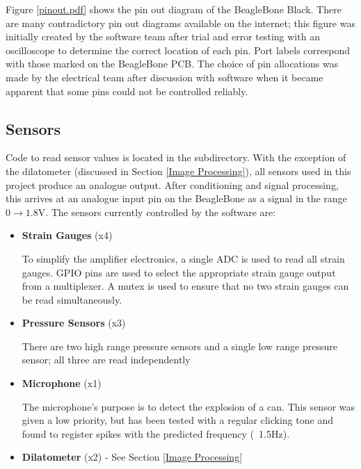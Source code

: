 Figure \ref{pinout.pdf} shows the pin out diagram of the BeagleBone Black. There are many contradictory pin out diagrams available on the internet; this figure was initially created by the software team after trial and error testing with an oscilloscope to determine the correct location of each pin. Port labels correspond with those marked on the BeagleBone PCB. The choice of pin allocations was made by the electrical team after discussion with software when it became apparent that some pins could not be controlled reliably.




\subsection{Sensors}

Code to read sensor values is located in the  subdirectory. With the exception of the dilatometer (discussed in Section \ref{Image Processing}), all sensors used in this project produce an analogue output. After conditioning and signal processing, this arrives at an analogue input pin on the BeagleBone as a signal in the range $0\to1.8\text{V}$. The sensors currently controlled by the software are:

\begin{itemize}
	\item {\bf Strain Gauges} (x4) 

	To simplify the amplifier electronics, a single ADC is used to read all strain gauges. GPIO pins are used to select the appropriate strain gauge output from a multiplexer. A mutex is used to ensure that no two strain gauges can be read simultaneously.


	\item {\bf Pressure Sensors} (x3) 

	 There are two high range pressure sensors and a single low range pressure sensor; all three are read independently
	\item {\bf Microphone} (x1) 

	The microphone's purpose is to detect the explosion of a can. This sensor was given a low priority, but has been tested with a regular clicking tone and found to register spikes with the predicted frequency (~1.5Hz).
	\item {\bf Dilatometer} (x2) -  See Section \ref{Image Processing}
\end{itemize}

